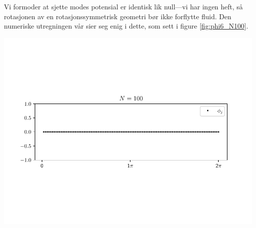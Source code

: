 \noindent Vi formoder at sjette modes potensial er identisk lik null---vi har ingen heft, så rotasjonen av en rotasjonssymmetrisk geometri bør ikke forflytte fluid.
Den numeriske utregningen vår sier seg enig i dette, som sett i figure \ref{fig:phi6_N100}.
\begin{Figure}
    \centering
    \captionsetup{type = figure}
    \includegraphics[width = \textwidth]{phi6_N100.pdf}
    \label{fig:phi6_N100}
\end{Figure}